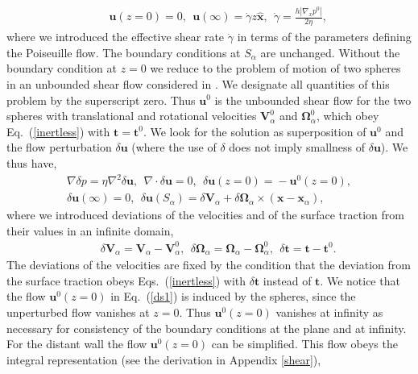 \begin{eqnarray}&&\!\!\!\!\!\!\!\!\!\!\!\!\!
\bm u(z=0)=0,\ \ \bm u(\infty)\!=\!\dot{\gamma}z\bm{\hat x}, \ \ \dot{\gamma}\!=\!\frac{h|\nabla_x p^0| }{2\eta},
\end{eqnarray}
where we introduced the effective shear rate $\dot{\gamma}$ in terms of the parameters defining the Poiseuille flow. The boundary conditions at $S_{\alpha}$ are unchanged. Without the boundary condition at $z=0$ we reduce to the problem of motion of two spheres in an unbounded shear flow considered in \cite{batchelor_green_1972}. We designate all quantities
of this problem by the superscript zero. Thus $\bm u^0$ is the unbounded shear flow for the two spheres with translational and rotational velocities $\bm V^0_{\alpha}$ and $\bm \Omega^0_{\alpha}$, which obey Eq.~(\ref{inertless}) with $\bm t=\bm t^0$. We look for the solution as superposition of $\bm u^0$ and the flow perturbation $\delta \bm u$ (where the use of $\delta$ does not imply smallness of $\delta \bm u$). We thus have,
\begin{equation}
  \begin{aligned}
\nabla \delta p\!=\!\eta\nabla^2\delta\bm u,\ \ \nabla\cdot\delta\bm u\!=\!0,\ \  \delta\bm u(z\!=\!0)\!=\!-\bm u^0(z\!=\!0),\\ %
\delta \bm u(\infty)\!=\!0,\ \ \delta \bm u(S_{\alpha})\!=\!\delta \bm V_{\alpha}\!+\!\delta\bm \Omega_{\alpha}\!\times\! (\bm x\!-\!\bm x_{\alpha}),
\end{aligned}
\label{ds1}
\end{equation}
where we introduced deviations of the velocities and of the surface traction from their values in an infinite domain,
\begin{eqnarray}&&\!\!\!\!\!\!\!\!\!\!\!
\delta\bm V_{\alpha}\!=\!\bm V_{\alpha}\!-\!\bm V^0_{\alpha},\ \ \delta\bm \Omega_{\alpha}\!=\!\bm \Omega_{\alpha}\!-\!\bm \Omega^0_{\alpha},\ \ \delta \bm t\!=\!\bm t\!-\!\bm t^0.
\end{eqnarray}
The deviations of the velocities are fixed by the condition that the deviation from the surface traction obeys Eqs.~(\ref{inertless}) with $\delta \bm t$ instead of $\bm t$. We notice that the flow $\bm u^0(z=0)$ in Eq.~(\ref{ds1}) is induced by the spheres, since the unperturbed flow vanishes at $z=0$. Thus $\bm u^0(z=0)$ vanishes at infinity as necessary for consistency of the boundary conditions at the plane and at infinity. For the distant wall the flow $\bm u^0(z\!=\!0)$ can be simplified. This flow obeys the integral representation (see the derivation in Appendix \ref{shear}),
